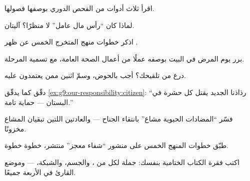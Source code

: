 \begin{exercise}[$\star$]\label{exo:g9:our-responsibility:4}
اقرأ ثلاث أدوات من الفحص الدوري بوصفها فصولها.
\end{exercise}

\begin{exercise}[$\star$]\label{exo:g9:our-responsibility:5}
لماذا كان  ``رأس مال عامل'' لا منظرًا؟
آليتان.
\end{exercise}

\begin{exercise}[$\star$]\label{exo:g9:our-responsibility:6}
اذكر خطوات منهج المتخرج الخمس عن ظهر .
\end{exercise}

\begin{exercise}[$\star\star$]\label{exo:g9:our-responsibility:7}
برر يوم المرض في البيت بوصفه عملًا من أعمال الصحة
العامة، مع تسمية المرحلة.
\end{exercise}

\begin{exercise}[$\star\star$]\label{exo:g9:our-responsibility:8}
درع من تلقيحك؟ أجب بالحوض، وسمّ اثنين ممن يعتمدون عليه.
\end{exercise}

\begin{exercise}[$\star\star$]\label{exo:g9:our-responsibility:9}
دقّق كما يدقّق \cref{ex:g9:our-responsibility:citizen}:
``رذاذنا الجديد يقتل كل حشرة في البستان --- حماية
تامة.''
\end{exercise}

\begin{exercise}[$\star\star$]\label{exo:g9:our-responsibility:10}
فسّر ``المضادات الحيوية مشاع'' بانتقاء الجناح ---
والعادتين اللتين تبقيان المشاع مخزونًا.
\end{exercise}

\begin{exercise}[$\star\star$]\label{exo:g9:our-responsibility:11}
طبّق خطوات المنهج الخمس على منشور ``شفاء معجز'' منتشر،
خطوة خطوة.
\end{exercise}

\begin{exercise}[$\star\star\star$]\label{exo:g9:our-responsibility:12}
اكتب فقرة الكتاب الختامية بنفسك: جملة لكل من ،
والجسم، والشبكة،  --- وموضع القارئ في
الأربعة جميعًا.
\end{exercise}

